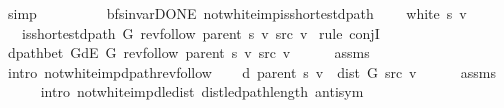 \begin{isabellebody}
\ simp\isanewline
\ \ \ \ \isamarkupfalse%
\isanewline
\ \ \isamarkupfalse%
\isanewline
{}\isamarkupfalse%
%
\endisatagproof
{\isafoldproof}%
%
\isadelimproof
\isanewline
%
\endisadelimproof
\isanewline
{}\isamarkupfalse%
\ {\isacharparenleft}{\kern0pt}\ bfs{\isacharunderscore}{\kern0pt}invar{\isacharunderscore}{\kern0pt}DONE{\isacharparenright}{\kern0pt}\ not{\isacharunderscore}{\kern0pt}white{\isacharunderscore}{\kern0pt}imp{\isacharunderscore}{\kern0pt}is{\isacharunderscore}{\kern0pt}shortest{\isacharunderscore}{\kern0pt}dpath{\isacharcolon}{\kern0pt}\isanewline
\ \ \ {\isachardoublequoteopen}{\isasymnot}\ white\ s\ v{\isachardoublequoteclose}\isanewline
\ \ \ {\isachardoublequoteopen}is{\isacharunderscore}{\kern0pt}shortest{\isacharunderscore}{\kern0pt}dpath\ G\ {\isacharparenleft}{\kern0pt}rev{\isacharunderscore}{\kern0pt}follow\ {\isacharparenleft}{\kern0pt}parent\ s{\isacharparenright}{\kern0pt}\ v{\isacharparenright}{\kern0pt}\ src\ v{\isachardoublequoteclose}\isanewline
%
\isadelimproof
%
\endisadelimproof
%
\isatagproof
{}\isamarkupfalse%
\ {\isacharparenleft}{\kern0pt}rule\ conjI{\isacharparenright}{\kern0pt}\isanewline
\ \ \isamarkupfalse%
\ {\isachardoublequoteopen}dpath{\isacharunderscore}{\kern0pt}bet\ {\isacharparenleft}{\kern0pt}G{\isachardot}{\kern0pt}dE\ G{\isacharparenright}{\kern0pt}\ {\isacharparenleft}{\kern0pt}rev{\isacharunderscore}{\kern0pt}follow\ {\isacharparenleft}{\kern0pt}parent\ s{\isacharparenright}{\kern0pt}\ v{\isacharparenright}{\kern0pt}\ src\ v{\isachardoublequoteclose}\isanewline
\ \ \ \ \isamarkupfalse%
\ assms\isanewline
\ \ \ \ \isamarkupfalse%
\ {\isacharparenleft}{\kern0pt}intro\ not{\isacharunderscore}{\kern0pt}white{\isacharunderscore}{\kern0pt}imp{\isacharunderscore}{\kern0pt}dpath{\isacharunderscore}{\kern0pt}rev{\isacharunderscore}{\kern0pt}follow{\isacharparenright}{\kern0pt}\isanewline
\ \ \isamarkupfalse%
\ {\isachardoublequoteopen}d\ {\isacharparenleft}{\kern0pt}parent\ s{\isacharparenright}{\kern0pt}\ v\ {\isacharequal}{\kern0pt}\ dist\ G\ src\ v{\isachardoublequoteclose}\isanewline
\ \ \ \ \isamarkupfalse%
\ assms\isanewline
\ \ \ \ \isamarkupfalse%
\ {\isacharparenleft}{\kern0pt}intro\ not{\isacharunderscore}{\kern0pt}white{\isacharunderscore}{\kern0pt}imp{\isacharunderscore}{\kern0pt}d{\isacharunderscore}{\kern0pt}le{\isacharunderscore}{\kern0pt}dist\ dist{\isacharunderscore}{\kern0pt}le{\isacharunderscore}{\kern0pt}dpath{\isacharunderscore}{\kern0pt}length\ antisym{\isacharparenright}{\kern0pt}\isanewline

\end{isabellebody}

